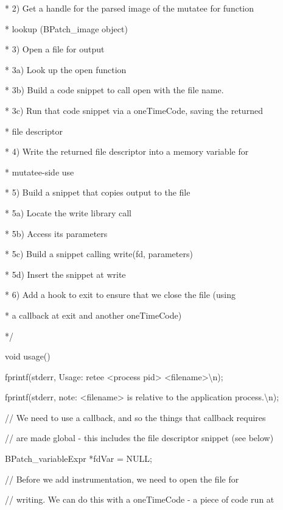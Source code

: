 {{{{{{{{
* 2) Get a handle for the parsed image of the mutatee for function}

{
* lookup (BPatch_image object)}

{
* 3) Open a file for output}

{
* 3a) Look up the {\textquotedbl}open{\textquotedbl} function}

{
* 3b) Build a code snippet to call open with the file name.}

{
* 3c) Run that code snippet via a oneTimeCode, saving the returned}

{
* file descriptor}

{
* 4) Write the returned file descriptor into a memory variable for}

{
* mutatee-side use}

{
* 5) Build a snippet that copies output to the file}

{
* 5a) Locate the {\textquotedbl}write{\textquotedbl} library call}

{
* 5b) Access its parameters}

{
* 5c) Build a snippet calling write(fd, parameters)}

{
* 5d) Insert the snippet at write}

{
* 6) Add a hook to exit to ensure that we close the file (using}

{
* a callback at exit and another oneTimeCode)}

{
*/}


\bigskip

{
void usage() {}

{
fprintf(stderr, {\textquotedbl}Usage: retee <process pid>
<filename>{\textbackslash}n{\textquotedbl});}

{
fprintf(stderr, {\textquotedbl} note: <filename> is relative to the application
process.{\textbackslash}n{\textquotedbl});}

{
}}


\bigskip

{
// We need to use a callback, and so the things that callback requires}

{
// are made global - this includes the file descriptor snippet (see below)}

{
BPatch_variableExpr *fdVar = NULL;}


\bigskip

{
// Before we add instrumentation, we need to open the file for}

{
// writing. We can do this with a oneTimeCode - a piece of code run at}

}}}}}}}

